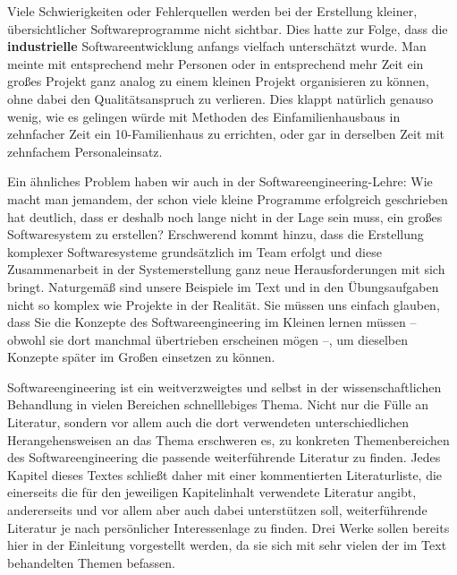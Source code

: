 
Viele Schwierigkeiten oder Fehlerquellen werden bei der Erstellung kleiner, übersichtlicher Softwareprogramme nicht sichtbar. Dies hatte zur Folge, dass die \mbox{\textbf{industrielle}} Softwareentwicklung anfangs vielfach unterschätzt wurde. Man meinte mit entsprechend mehr Personen oder in entsprechend mehr Zeit ein großes Projekt ganz analog zu einem kleinen Projekt organisieren zu können, ohne dabei den Qualitätsanspruch zu verlieren. Dies klappt natürlich genauso wenig, wie es gelingen würde mit Methoden des Einfamilienhausbaus in zehnfacher Zeit ein 10-Familienhaus zu errichten, oder gar in derselben Zeit mit zehnfachem Personaleinsatz. 


Ein ähnliches Problem haben wir auch in der Softwareengineering-Lehre: Wie macht man jemandem, der schon viele kleine Programme erfolgreich geschrieben hat deutlich, dass er deshalb noch lange nicht in der Lage sein muss, ein großes Software\-system zu erstellen? Erschwerend kommt hinzu, dass die Erstellung komplexer Softwaresysteme grundsätzlich im Team erfolgt und diese Zusammenarbeit in der System\-erstel\-lung ganz neue Herausforderungen mit sich bringt. Naturgemäß sind unsere Beispiele im Text und in den Übungsaufgaben nicht so komplex wie Projekte in der Realität. Sie müssen uns einfach glauben, dass Sie die Konzepte des Software\-engineering im Kleinen lernen müssen – obwohl sie dort manchmal übertrieben erscheinen mögen –, um dieselben Konzepte später im Großen einsetzen zu können.

Softwareengineering ist ein weitverzweigtes und selbst in der wissenschaftlichen Behandlung in vielen Bereichen schnelllebiges Thema. Nicht nur die Fülle an Literatur, sondern vor allem auch die dort verwendeten unterschiedlichen Herangehensweisen an das Thema erschweren es, zu konkreten Themenbereichen des Software\-engineering die passende weiterführende Literatur zu finden. Jedes Kapitel dieses Textes schließt daher mit einer kommentierten  Literaturliste, die einerseits die für den jeweiligen Kapitelinhalt verwendete Literatur angibt, andererseits und vor allem aber auch dabei unterstützen soll, weiterführende Literatur je nach persönlicher Interessen\-lage zu finden. Drei Werke sollen bereits hier in der Einleitung vorgestellt werden, da sie sich mit sehr vielen der im Text behandelten Themen befassen. 
\\

